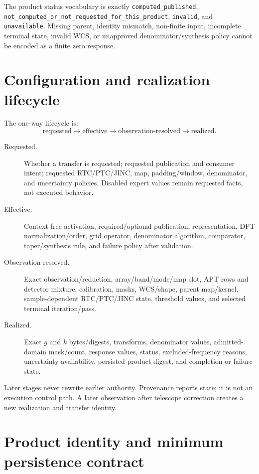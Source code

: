 \documentclass[11pt]{article}
\begin{document}
The product status vocabulary is exactly
\texttt{computed\_published},
\texttt{not\_computed\_or\_not\_requested\_for\_this\_product},
\texttt{invalid}, and \texttt{unavailable}.  Missing parent, identity mismatch,
non-finite input, incomplete terminal state, invalid WCS, or unapproved
denominator/synthesis policy cannot be encoded as a finite zero response.

\section{Configuration and realization lifecycle}

The one-way lifecycle is:
\[
 \text{requested}\rightarrow\text{effective}\rightarrow
 \text{observation-resolved}\rightarrow\text{realized}.
\]

\begin{description}
\item[Requested.] Whether a transfer is requested; requested publication and
consumer intent; requested RTC/PTC/JINC, map, padding/window, denominator, and
uncertainty policies.  Disabled expert values remain requested facts, not
executed behavior.
\item[Effective.] Context-free activation, required/optional publication,
representation, DFT normalization/order, grid operator, denominator algorithm,
comparator, taper/synthesis rule, and failure policy after validation.
\item[Observation-resolved.] Exact observation/reduction, array/band/mode/map
slot, APT rows and detector mixture, calibration, masks, WCS/shape, parent
map/kernel, sample-dependent RTC/PTC/JINC state, threshold values, and selected
terminal iteration/pass.
\item[Realized.] Exact $g$ and $k$ bytes/digests, transforms, denominator
values, admitted-domain mask/count, response values, status, excluded-frequency
reasons, uncertainty availability, persisted product digest, and completion or
failure state.
\end{description}

Later stages never rewrite earlier authority.  Provenance reports state; it is
not an execution control path.  A later observation after telescope correction
creates a new realization and transfer identity.

\section{Product identity and minimum persistence contract}
\end{document}
